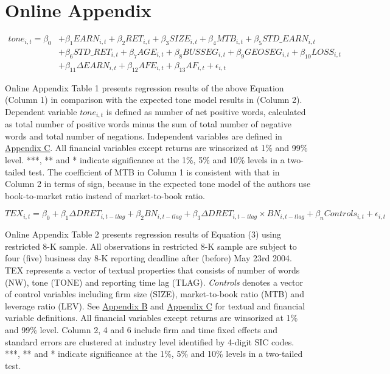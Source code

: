 \section*{Online Appendix}


\begin{equation*}
\begin{split}
tone_{i,t}=\beta_0&+\beta_1EARN_{i,t}+\beta_2RET_{i,t}+\beta_3SIZE_{i,t}+\beta_4MTB_{i,t}+\beta_5STD\_EARN_{i,t}\\
&+\beta_6STD\_RET_{i,t}+\beta_7AGE_{i,t}+\beta_8BUSSEG_{i,t}+\beta_9GEOSEG_{i,t}+\beta_{10}LOSS_{i,t}\\
&+\beta_{11}\Delta EARN_{i,t}+\beta_{12}AFE_{i,t}+\beta_{13}AF_{i,t}+\epsilon_{i,t}
\end{split}
\end{equation*}

Online Appendix Table 1 presents regression results of the above Equation (Column 1) in comparison with the expected tone model results in \cite{huangToneManagement2014} (Column 2). Dependent variable $tone_{i,t}$ is defined as number of net positive words, calculated as total number of positive words minus the sum of total number of negative words and total number of negations. Independent variables are defined in \hyperref[appc]{Appendix C}. All financial variables except returns are winsorized at 1\% and 99\% level. ***, ** and * indicate significance at the 1\%, 5\% and 10\% levels in a two-tailed test. The coefficient of MTB in Column 1 is consistent with that in Column 2 in terms of sign, because in the expected tone model of \cite{huangToneManagement2014} the authors use book-to-market ratio instead of market-to-book ratio. 


\newpage

\setcounter{equation}{2}
\begin{equation}
TEX_{i,t}=\beta_0+\beta_1\Delta DRET_{i,t-tlag}+\beta_2BN_{i,t-tlag}+\beta_3\Delta DRET_{i,t-tlag}\times BN_{i,t-tlag}+\beta_nControls_{i,t}+\epsilon_{i,t}
\end{equation}

Online Appendix Table 2 presents regression results of Equation (3) using restricted 8-K sample. All observations in restricted 8-K sample are subject to four (five) business day 8-K reporting deadline after (before) May 23rd 2004. TEX represents a vector of textual properties that consists of number of words (NW), tone (TONE) and reporting time lag (TLAG). \textit{Controls} denotes a vector of control variables including firm size (SIZE), market-to-book ratio (MTB) and leverage ratio (LEV). See \hyperref[appb]{Appendix B} and \hyperref[appc]{Appendix C} for textual and financial variable definitions. All financial variables except returns are winsorized at 1\% and 99\% level. Column 2, 4 and 6 include firm and time fixed effects and standard errors are clustered at industry level identified by 4-digit SIC codes. ***, ** and * indicate significance at the 1\%, 5\% and 10\% levels in a two-tailed test.
